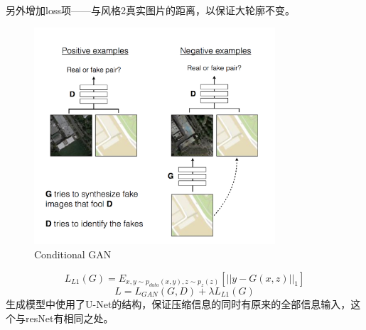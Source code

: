 \documentclass[a4paper]{article}
\begin{document}
另外增加loss项——与风格2真实图片的距离，以保证大轮廓不变。
\begin{figure}[H]
\centering
\includegraphics[width=0.8\textwidth]{./img/11.png}
\caption{Conditional GAN}
\label{fig:11}
\end{figure}

$$L_{L1}(G) = E_{x,y\sim p_{data}(x,y),z\sim p_z(z)}\left[||y-G(x,z)||_1\right]$$
$$L = L_{GAN}(G,D) + \lambda L_{L1}(G)$$
生成模型中使用了U-Net的结构，保证压缩信息的同时有原来的全部信息输入，这个与resNet有相同之处。
\end{document}
